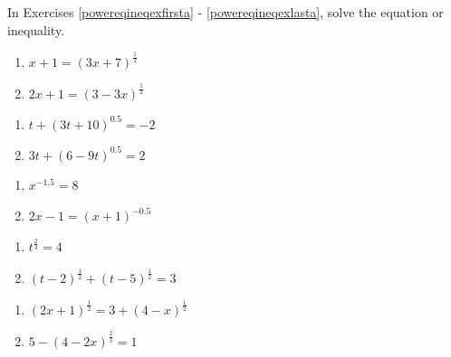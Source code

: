 \documentclass{ximera}
\begin{document}
	\author{Stitz-Zeager}


In Exercises \ref{powereqineqexfirsta} - \ref{powereqineqexlasta}, solve the equation or inequality.  


\begin{multicols}{2}
\begin{enumerate}


\item $x+1 = (3x+7)^{\frac{1}{2}}$ \label{powereqineqexfirsta}
\item  $2x+1 = (3-3x)^{\frac{1}{2}}$

\setcounter{HW}{\value{enumi}}
\end{enumerate}
\end{multicols}

\begin{multicols}{2}
\begin{enumerate}
\setcounter{enumi}{\value{HW}}


\item  $t + (3t+10)^{0.5} = -2$
\item  $3t+(6-9t)^{0.5}=2$

\setcounter{HW}{\value{enumi}}
\end{enumerate}
\end{multicols}

\begin{multicols}{2}
\begin{enumerate}
\setcounter{enumi}{\value{HW}}

\item $x^{-1.5} = 8$
\item $2x - 1 =  (x + 1)^{-0.5}$

\setcounter{HW}{\value{enumi}}
\end{enumerate}
\end{multicols}

\begin{multicols}{2}
\begin{enumerate}
\setcounter{enumi}{\value{HW}}

\item $t^{\frac{2}{3}} = 4$
\item $(t - 2)^{\frac{1}{2}} + (t - 5)^{\frac{1}{2}} = 3$

\setcounter{HW}{\value{enumi}}
\end{enumerate}
\end{multicols}

\begin{multicols}{2}
\begin{enumerate}
\setcounter{enumi}{\value{HW}}

\item $(2x+1)^{\frac{1}{2}} = 3 + (4-x)^{\frac{1}{2}}$
\item  $5 - (4-2x)^{\frac{2}{3}} = 1$

\setcounter{HW}{\value{enumi}}
\end{enumerate}
\end{multicols}
\end{document}
